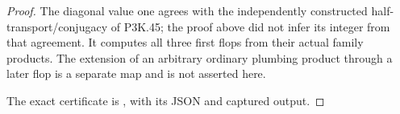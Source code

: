 \begin{proof}
The diagonal value one agrees with the independently constructed
half-transport/conjugacy of P3K.45; the proof above did not infer its
integer from that agreement. It computes all three first flops
from their actual family products. The extension of an arbitrary
ordinary plumbing product through a later flop is a separate map
and is not asserted here.

The exact certificate is , with its JSON and captured output.
\end{proof}
